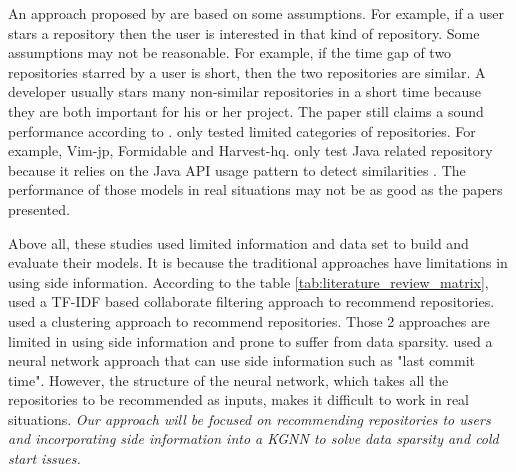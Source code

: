 \documentclass[11pt,twoside]{report}
\begin{document}
An approach proposed by \cite{zhang_detecting_2017} are based on some assumptions. For example, if a user stars a repository then the user is interested in that kind of repository. Some assumptions may not be reasonable. For example, if the time gap of two repositories starred by a user is short, then the two repositories are similar. A developer usually stars many non-similar repositories in a short time because they are both important for his or her project. The paper still claims a sound performance according to \cite{zhang_detecting_2017}. \cite{xu_repersp_2017, sun_personalized_2018, zhang_detecting_2017} only tested limited categories of repositories. For example, Vim-jp, Formidable and Harvest-hq. \cite{sun_personalized_2018} only test Java related repository because it relies on the Java API usage pattern to detect similarities \cite{zhang_detecting_2017}. The performance of those models in real situations may not be as good as the papers presented.

Above all, these studies used limited information and data set to build and evaluate their models. It is because the traditional approaches have limitations in using side information. According to the table \ref{tab:literature_review_matrix}, \cite{xu_repersp_2017,inka_open_2018,sun_personalized_2018,zhang_detecting_2017} used a TF-IDF based collaborate filtering approach to recommend repositories. \cite{guendouz_recommending_2015} used a clustering approach to recommend repositories. Those 2 approaches are limited in using side information and prone to suffer from data sparsity. \cite{liu_recommending_2018} used a neural network approach that can use side information such as "last commit time". However, the structure of the neural network, which takes all the repositories to be recommended as inputs, makes it difficult to work in real situations. \textit{Our approach will be focused on recommending repositories to users and incorporating side information into a KGNN to solve data sparsity and cold start issues.}
\end{document}
